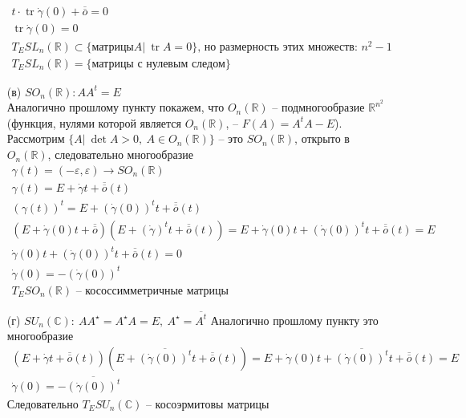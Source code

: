 \begin{enumerate}
\begin{gather*}
		t \cdot \operatorname{tr} \dot{\gamma}(0) + \overline{\overline{o}} = 0\\
		\operatorname{tr} \dot{\gamma}(0) = 0\\
		T_E SL_n (\mathbb{R}) \subset \{\text{матрицы} A|\ \operatorname{tr}A = 0\}\text{, но размерность этих множеств: } n^2 - 1\\
		T_E SL_n (\mathbb{R}) = \{\text{матрицы с нулевым следом}\}
	\end{gather*}
\item[(в)]
	$SO_n(\mathbb{R}): AA^t = E$\\
	Аналогично прошлому пункту покажем, что $O_n(\mathbb{R})$ -- подмногообразие $\mathbb{R}^{n^2}$ (функция, нулями которой является $O_n(\mathbb{R})$, -- $F(A) = A^{t}A - E$). Рассмотрим $\{A|\ \det A > 0,\ A \in O_n(\mathbb{R})\}$ -- это $SO_n(\mathbb{R})$, открыто в $O_n(\mathbb{R})$, следовательно многообразие
	\begin{gather*}
		\gamma(t) = (-\varepsilon, \varepsilon) \to SO_n(\mathbb{R})\\
		\gamma(t) = E + \dot{\gamma}t + \overline{\overline{o}}(t)\\
		(\gamma(t))^t = E + (\dot{\gamma}(0))^t t + \overline{\overline{o}}(t)\\
		(E + \dot{\gamma}(0)t + \overline{\overline{o}})(E + (\dot{\gamma})^t t + \overline{\overline{o}}(t)) = E + \dot{\gamma}(0)t + (\dot{\gamma}(0))^t t + \overline{\overline{o}}(t) = E\\
		\dot{\gamma}(0)t + (\dot{\gamma}(0))^t t + \overline{\overline{o}}(t) = 0\\
		\dot{\gamma}(0) = -(\dot{\gamma}(0))^t\\
		T_E SO_n(\mathbb{R}) \text{ -- кососсимметричные матрицы}
	\end{gather*}
\item[(г)]
	$SU_n(\mathbb{C}):\ AA^{\star} = A^{\star}A = E,\ A^{\star} = \overline{A^{t}}$ Аналогично прошлому пункту это многообразие
	\begin{gather*}
		(E + \dot{\gamma}t + \overline{\overline{o}}(t))(E + \overline{(\dot{\gamma}(0))^t}t + \overline{\overline{o}}(t)) =
		E + \dot{\gamma}(0)t + \overline{(\dot{\gamma}(0))^t} t + \overline{\overline{o}}(t) = E\\
		\dot{\gamma}(0) = -\overline{(\dot{\gamma}(0))^t}
	\end{gather*}
	Следовательно $T_E SU_n(\mathbb{C})$ -- косоэрмитовы матрицы
\end{enumerate}

\newpage
